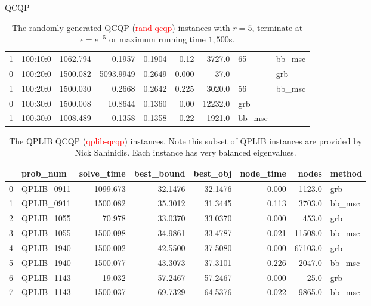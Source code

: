 \documentclass[aspectratio=1610, 9pt]{beamer}
\newcommand{\redsf}[1]{\textcolor{red}{\textsf{#1}}}
\begin{document}
\begin{frame}[standout]{QCQP}
\begin{table}[h!]
\begin{tabular}{llrrrrrll}
      1  & 100:10:0  & 1062.794    & 0.1957      & 0.1904    & 0.12       & 3727.0  & 65       & bb\_msc \\
      0  & 100:20:0  & 1500.082    & 5093.9949   & 0.2649    & 0.000      & 37.0    & -        & grb     \\
      1  & 100:20:0  & 1500.030    & 0.2668      & 0.2642    & 0.225      & 3020.0  & 56       & bb\_msc \\
      0  & 100:30:0  & 1500.008    & 10.8644     & 0.1360    & 0.00       & 12232.0 & grb                \\
      1  & 100:30:0  & 1008.489    & 0.1358      & 0.1358    & 0.22       & 1921.0  & bb\_msc            \\
      \bottomrule
    \end{tabular}
    \caption{The randomly generated QCQP (\redsf{rand-qcqp}) instances with \(r = 5\), terminate at \(\epsilon = e^{-5}\) or maximum running time \(1,500\)s. }
  \end{table}

  \begin{table}[h!]
    \begin{tabular}{llrrrrrl}
      \toprule
      {} & prob\_num   & solve\_time & best\_bound & best\_obj & node\_time & nodes   & method  \\
      \midrule
      0  & QPLIB\_0911 & 1099.673    & 32.1476     & 32.1476   & 0.000      & 1123.0  & grb     \\
      1  & QPLIB\_0911 & 1500.082    & 35.3012     & 31.3445   & 0.113      & 3703.0  & bb\_msc \\
      2  & QPLIB\_1055 & 70.978      & 33.0370     & 33.0370   & 0.000      & 453.0   & grb     \\
      3  & QPLIB\_1055 & 1500.098    & 34.9861     & 33.4787   & 0.021      & 11508.0 & bb\_msc \\
      4  & QPLIB\_1940 & 1500.002    & 42.5500     & 37.5080   & 0.000      & 67103.0 & grb     \\
      5  & QPLIB\_1940 & 1500.077    & 43.3073     & 37.3101   & 0.226      & 2047.0  & bb\_msc \\
      6  & QPLIB\_1143 & 19.032      & 57.2467     & 57.2467   & 0.000      & 25.0    & grb     \\
      7  & QPLIB\_1143 & 1500.037    & 69.7329     & 64.5376   & 0.022      & 9865.0  & bb\_msc \\
      \bottomrule
    \end{tabular}
    \caption{The QPLIB QCQP (\redsf{qplib-qcqp}) instances. Note this subset of QPLIB instances are provided by Nick Sahinidis. Each instance has very balanced eigenvalues.}
  \end{table}


\end{frame}
\end{document}
